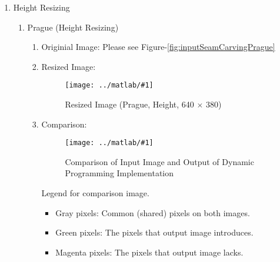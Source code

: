 \documentclass{article}
\newcommand{\listFigure}[3]{ \begin{figure}[H]
\texttt{[image: ../matlab/\#1]}
		\caption{#2\label{fig:#3}}
	\end{figure}		
}
\begin{document}
\begin{enumerate}
\begin{enumerate}
		\pagebreak
		\item Mall (Width Resizing)\\
		\begin{enumerate}
			\item Originial Image: \\
			\listFigure{inputSeamCarvingMall.jpg}{Input Image (Mall, 775 $\times$
			769)}{inputSeamCarvingMall}
			\pagebreak
			\item Resized Image: \\
			\listFigure{outputReduceWidthMall.png}{Resized Image (Mall, Width, 675
			$\times$ 769)}{outputReduceWidthMall}
			\pagebreak
			\item Comparison: \\
			\listFigure{outputReduceWidthInputvsDynamicMall.png}{Comparison
			Image}{outputReduceWidthInputvsDynamicMall}
			Legend for comparison image.
			\begin{itemize}
				\item Gray pixels: Common (shared) pixels on both images.
				\item Green pixels: The pixels that output image introduces.
				\item Magenta pixels: The pixels that output image lacks.
			\end{itemize}
		\end{enumerate}
		\pagebreak
		\item Script: SeamCarvingReduceWidth.m
		
	\end{enumerate}
	\pagebreak
	
	\item Height Resizing \\
		\begin{enumerate} 
		\item Prague (Height Resizing) \\
		\begin{enumerate}
			\item Originial Image: Please see Figure-\ref{fig:inputSeamCarvingPrague} \\
			\item Resized Image: \\
			\listFigure{outputReduceWidthPrague}{Resized Image (Prague, Height, 640
			$\times$ 380)}{outputReduceHeightPrague}
			\pagebreak
			\item Comparison: \\
			\listFigure{outputReduceHeightInputvsDynamicPrague.png}{Comparison of Input Image and Output of Dynamic Programming
				Implementation}{outputReduceHeightInputvsDynamicPrague}
			Legend for comparison image.
			\begin{itemize}
				\item Gray pixels: Common (shared) pixels on both images.
				\item Green pixels: The pixels that output image introduces.
				\item Magenta pixels: The pixels that output image lacks.
			\end{itemize}
		\end{enumerate}
		\pagebreak
		

\end{enumerate}
\end{enumerate}
\end{document}
